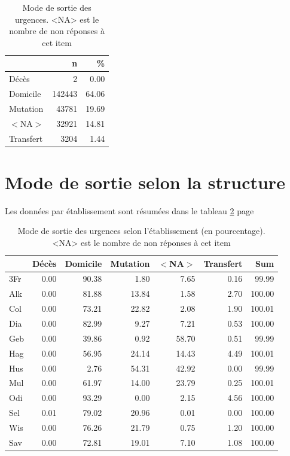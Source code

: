 \documentclass[12pt,english,french,twoside]{report}\usepackage[]{graphicx}\usepackage[]{color}
\begin{document}
\begin{table}[ht]
\centering
\begin{tabular}{|l|r|r|}
  \hline
 & n & \% \\ 
  \hline
Décès & 2 & 0.00 \\ 
  Domicile & 142443 & 64.06 \\ 
  Mutation & 43781 & 19.69 \\ 
  $<$NA$>$ & 32921 & 14.81 \\ 
  Transfert & 3204 & 1.44 \\ 
   \hline
\end{tabular}
\caption[Mode de sortie des urgences]{Mode de sortie des urgences. <NA> est le nombre de non réponses à cet item} 
\label{tab.sortie}
\end{table}



\section{Mode de sortie selon la structure}

Les données par établissement sont résumées dans le tableau \ref{tab.sortie_etab} page \pageref{tab.sortie_etab}

\begin{table}[ht]
\centering
\begin{tabular}{|l|r|r|r|r|r|r|}
  \hline
 & Décès & Domicile & Mutation & $<$NA$>$ & Transfert & Sum \\ 
  \hline
3Fr & 0.00 & 90.38 & 1.80 & 7.65 & 0.16 & 99.99 \\ 
  Alk & 0.00 & 81.88 & 13.84 & 1.58 & 2.70 & 100.00 \\ 
  Col & 0.00 & 73.21 & 22.82 & 2.08 & 1.90 & 100.01 \\ 
  Dia & 0.00 & 82.99 & 9.27 & 7.21 & 0.53 & 100.00 \\ 
  Geb & 0.00 & 39.86 & 0.92 & 58.70 & 0.51 & 99.99 \\ 
  Hag & 0.00 & 56.95 & 24.14 & 14.43 & 4.49 & 100.01 \\ 
  Hus & 0.00 & 2.76 & 54.31 & 42.92 & 0.00 & 99.99 \\ 
  Mul & 0.00 & 61.97 & 14.00 & 23.79 & 0.25 & 100.01 \\ 
  Odi & 0.00 & 93.29 & 0.00 & 2.15 & 4.56 & 100.00 \\ 
  Sel & 0.01 & 79.02 & 20.96 & 0.01 & 0.00 & 100.00 \\ 
  Wis & 0.00 & 76.26 & 21.79 & 0.75 & 1.20 & 100.00 \\ 
  Sav & 0.00 & 72.81 & 19.01 & 7.10 & 1.08 & 100.00 \\ 
   \hline
\end{tabular}
\caption[Mode de sortie selon l'établissement]{Mode de sortie des urgences selon l'établissement (en pourcentage). <NA> est le nombre de non réponses à cet item} 
\label{tab.sortie_etab}
\end{table}
\end{document}
